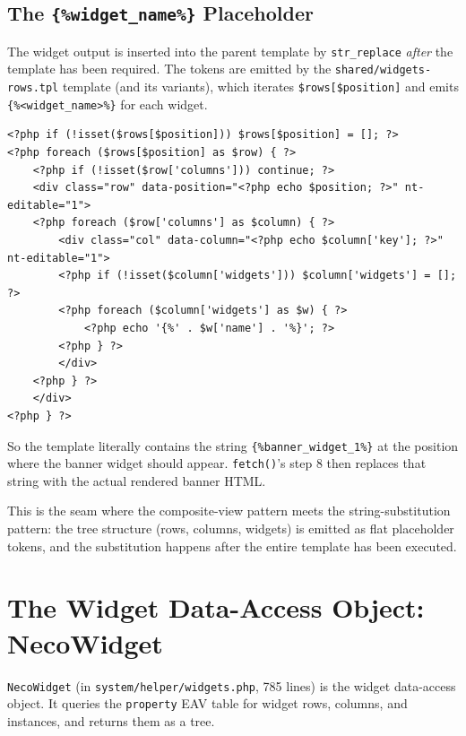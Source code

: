 \documentclass[11pt,a4paper]{article}
\begin{document}
\subsection{The \texttt{\{\%widget\_name\%\}} Placeholder}

The widget output is inserted into the parent template by
\texttt{str\_replace} \emph{after} the template has been required.
The tokens are emitted by the \texttt{shared/widgets-rows.tpl}
template (and its variants), which iterates
\texttt{\$rows[\$position]} and emits
\texttt{\{\%<widget\_name>\%\}} for each widget.

\begin{lstlisting}[caption={\texttt{shared/widgets-rows.tpl} --- the placeholder emitter (abridged).},label={lst:widgets-rows}]
<?php if (!isset($rows[$position])) $rows[$position] = []; ?>
<?php foreach ($rows[$position] as $row) { ?>
    <?php if (!isset($row['columns'])) continue; ?>
    <div class="row" data-position="<?php echo $position; ?>" nt-editable="1">
    <?php foreach ($row['columns'] as $column) { ?>
        <div class="col" data-column="<?php echo $column['key']; ?>" nt-editable="1">
        <?php if (!isset($column['widgets'])) $column['widgets'] = []; ?>
        <?php foreach ($column['widgets'] as $w) { ?>
            <?php echo '{%' . $w['name'] . '%}'; ?>
        <?php } ?>
        </div>
    <?php } ?>
    </div>
<?php } ?>
\end{lstlisting}

So the template literally contains the string
\texttt{\{\%banner\_widget\_1\%\}} at the position where the
banner widget should appear. \texttt{fetch()}'s step 8 then
replaces that string with the actual rendered banner HTML.

This is the seam where the composite-view pattern meets the
string-substitution pattern: the tree structure (rows, columns,
widgets) is emitted as flat placeholder tokens, and the
substitution happens after the entire template has been
executed.

\section{The Widget Data-Access Object: NecoWidget}\label{sec:widget-dao}

\texttt{NecoWidget} (in \texttt{system/helper/widgets.php}, 785
lines) is the widget data-access object. It queries the
\texttt{property} EAV table for widget rows, columns, and
instances, and returns them as a tree.
\end{document}
